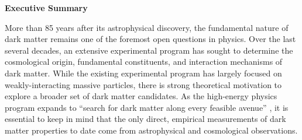 \begin{comment}

\begin{center}
  {\Large \bf Abstract}
\end{center}
Astrophysical and cosmological observations currently provide the only robust, empirical measurements of dark matter. Future observations with Large Synoptic Survey Telescope (LSST) will provide necessary guidance for the experimental dark matter program. This white paper represents a community effort to summarize the science case for studying the fundamental physics of dark matter with LSST. We discuss how LSST will inform our understanding of the fundamental properties of dark matter, such as particle mass, self-interaction strength, non-gravitational couplings to the Standard Model, and compact object abundances. Additionally, we discuss the ways that LSST will complement other experiments to strengthen our understanding of the fundamental characteristics of dark matter. More information on the LSST dark matter effort can be found at https://lsstdarkmatter.github.io/ .

\clearpage
\end{comment}


\begin{center}
  {\Large \bf Executive Summary}
\end{center}

More than 85 years after its astrophysical discovery, the fundamental nature of dark matter remains one of the foremost open questions in physics.
Over the last several decades, an extensive experimental program has sought to determine the cosmological origin, fundamental constituents, and interaction mechanisms of dark matter. 
While the existing experimental program has largely focused on weakly-interacting massive particles, there is strong theoretical motivation to explore a broader set of dark matter candidates.
As the high-energy physics program expands to ``search for dark matter along every feasible avenue'' \citep{P5Report}, it is essential to keep in mind that the only direct, empirical measurements of dark matter properties to date come from astrophysical and cosmological observations.


